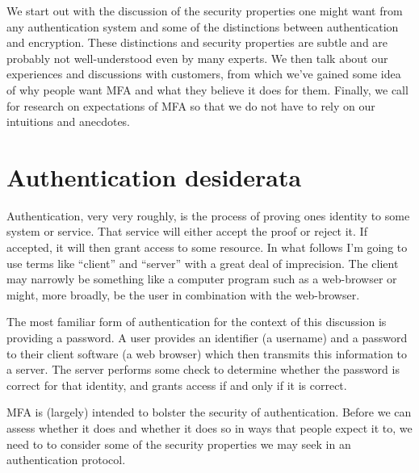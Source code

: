 \documentclass[12pt]{article}
\begin{document}
We start out with the discussion of the security properties one might want from any authentication system and some of the distinctions between authentication and encryption.
These distinctions and security properties are subtle and are probably not well-understood even by many experts. 
We then talk about our experiences and discussions with customers, from which we've gained some idea of why people want MFA and what they believe it does for them.
Finally, we call for research on expectations of MFA so that we do not have to rely on our intuitions and anecdotes.

\section{Authentication desiderata}\label{sec:desiderata}

Authentication, very very roughly, is the process of proving ones identity to some system or service.
That service will either accept the proof or reject it.
If accepted, it will then grant access to some resource. In what follows I'm going to use terms like ``client'' and ``server'' with a great deal of imprecision. The client may narrowly be something like a computer program such as a web-browser or might, more broadly, be the user in combination with the web-browser.

The most familiar form of authentication for the context of this discussion is providing a password. A user provides an identifier (a username) and a password to their client software (a web browser) which then transmits this information to a server. The server performs some check to determine whether the password is correct for that identity, and grants access if and only if it is correct.

MFA is (largely) intended to bolster the security of authentication.
Before we can assess whether it does and whether it does so in ways that people expect it to,
we need to to consider some of the security properties we may seek in an authentication protocol.
\end{document}
